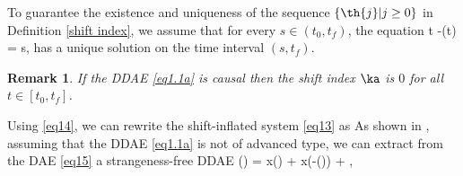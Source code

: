 \documentclass[final,reqno]{siamltex}
\newtheorem{remark}[theorem]{Remark}
\begin{document}
To guarantee the existence and uniqueness of the sequence $\{\th{j}| j\geq 0\}$ in Definition \ref{shift index}, we assume that for every $s \in (t_0,t_f)$, the equation
%
\be\label{shift equation}
 t -\tau(t) = s,
\ee
%
has a unique solution on the time interval $(s,t_f)$. 

\begin{remark}
If the DDAE \eqref{eq1.1a} is causal then the shift index $\ka$ is $0$ for all $t \in [t_0,t_f]$.
\end{remark}

Using \eqref{eq14}, we can rewrite the shift-inflated system \eqref{eq13} as
%
\be\label{eq15}
\ee
%
As shown in \cite{HaM14}, assuming that the DDAE \eqref{eq1.1a} is not of advanced type, we can extract from the DAE \eqref{eq15} a strangeness-free DDAE 
%
\be\label{eq16}
  () \!=\!  x() \!+\!
  x(-\tau()) \!+\! , \ 
\end{document}

